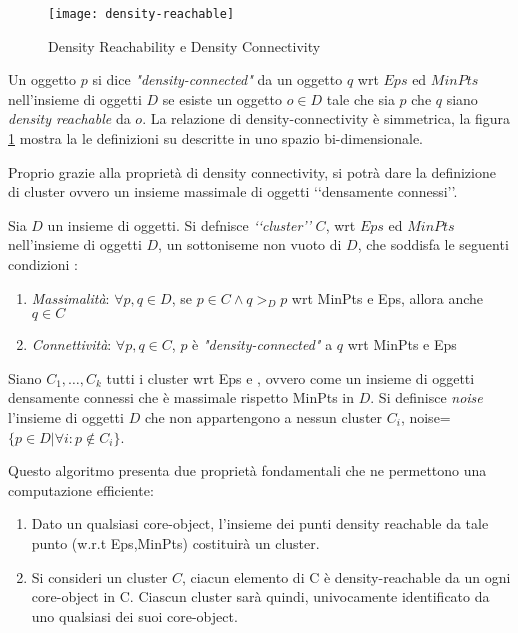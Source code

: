 \begin{figure}
\centering
\texttt{[image: density-reachable]}
\caption{Density Reachability e Density Connectivity}
\label{fig:dens-reach}
\end{figure}
\begin{definizione}
\label{def:dc}
Un oggetto $p$ si dice 	\emph{"density-connected"} da un oggetto $q$ wrt $Eps$ ed $MinPts$ nell'insieme di oggetti $D$ se esiste un oggetto $o \in D$  tale che sia $p$ che $q$ siano \emph{ density reachable} da $o$. La relazione di density-connectivity è simmetrica, la figura \ref{fig:dens-reach} mostra la le definizioni su descritte in uno spazio bi-dimensionale. 
\end{definizione} 
Proprio grazie alla proprietà di density connectivity, si potrà dare la definizione di cluster ovvero un insieme massimale di oggetti \lq\lq densamente connessi\rq\rq.
\begin{definizione}[cluster]
\label{def:cluster}
Sia $D$ un insieme di oggetti.
Si defnisce \emph{\lq\lq cluster\rq\rq}  $C$,  wrt $Eps$ ed $MinPts$ nell'insieme di oggetti $D$,
un sottoniseme non vuoto di $D$, che soddisfa le seguenti condizioni :
\begin{enumerate}
\item \emph{Massimalità}: $\forall p,q\in D$, se $p \in C \land q>_{D}p$ wrt MinPts e Eps, 
allora anche $q \in C  $

\item \emph{Connettività}: $\forall p,q\in C$, $p$ è \emph{"density-connected"} a $q$  wrt MinPts e Eps

\end{enumerate}
 
\end{definizione} 


\begin{definizione}[noise]
\label{def:noise}
Siano $C_1,\dots,C_k$ tutti i cluster wrt Eps e , ovvero come un insieme di oggetti densamente connessi che è massimale rispetto MinPts in $D$. Si definisce \emph{noise}  l'insieme di oggetti $D$ che non appartengono a nessun cluster $C_i$,
noise=$\lbrace p\in D | \forall i: p \notin C_i \rbrace $.
 
\end{definizione}
Questo algoritmo presenta due proprietà fondamentali che ne permettono una computazione efficiente:
\begin{enumerate}
\item Dato un qualsiasi core-object, l'insieme dei punti density reachable da tale punto (w.r.t Eps,MinPts) costituirà un cluster.
\item  Si consideri un cluster $C$, ciacun elemento di C è density-reachable da  un ogni core-object in C. Ciascun cluster sarà quindi, univocamente identificato da uno qualsiasi dei suoi core-object.
\end{enumerate}

